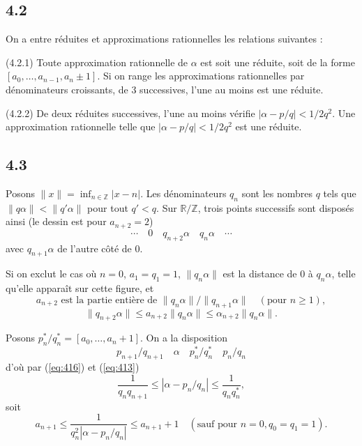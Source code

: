 \documentclass[12pt]{amsart}
\theoremstyle{plain}
\theoremstyle{remark}
\begin{document}
\subsection*{4.2}
On a entre r\'{e}duites et approximations rationnelles les relations suivantes :

(4.2.1) Toute approximation rationnelle de $\alpha$ est soit une r\'{e}duite, soit de la forme $[a_{0}, \ldots, a_{n-1}, a_{n} \pm 1]$. Si on range les approximations rationnelles par d\'{e}nominateurs croissants, de $3$ successives, l'une au moins est une r\'{e}duite.

(4.2.2) De deux r\'{e}duites successives, l'une au moins v\'{e}rifie $|\alpha - p/q| < 1/2q^{2}$. Une approximation rationnelle telle que $|\alpha - p/q| < 1/2q^{2}$ est une r\'{e}duite.

\subsection*{4.3}
Posons $\|x\| = \inf_{n \in \mathbb{Z}} |x - n|$. Les d\'{e}nominateurs $q_{n}$ sont les nombres $q$ tels que $\|q\alpha\| < \|q'\alpha\|$ pour tout $q' < q$. Sur $\mathbb{R}/\mathbb{Z}$, trois points successifs sont dispos\'{e}s ainsi (le dessin est pour $a_{n+2} = 2$)
\[
\cdots \quad 0 \quad q_{n+2}\alpha \quad q_{n}\alpha \quad \cdots
\]
avec $q_{n+1}\alpha$ de l'autre c\^{o}t\'{e} de $0$.

Si on exclut le cas o\`{u} $n = 0$, $a_{1} = q_{1} = 1$, $\|q_{n}\alpha\|$ est la distance de $0$ \`{a} $q_{n}\alpha$, telle qu'elle appara\^{i}t sur cette figure, et
\begin{equation}\label{eq:432}
a_{n+2} \text{ est la partie enti\`{e}re de } \|q_{n}\alpha\|/\|q_{n+1}\alpha\| \quad (\text{pour } n \geq 1) ,
\end{equation}
\begin{equation}\label{eq:433}
\|q_{n+2}\alpha\| \leq a_{n+2}\|q_{n}\alpha\| \leq \alpha_{n+2}\|q_{n}\alpha\| .
\end{equation}

Posons $p_{n}^{*}/q_{n}^{*} = [a_{0}, \ldots, a_{n} + 1]$. On a la disposition
\[
p_{n+1}/q_{n+1} \quad \alpha \quad p_{n}^{*}/q_{n}^{*} \quad p_{n}/q_{n}
\]
d'o\`{u} par (\ref{eq:416}) et (\ref{eq:413})
\begin{equation}\label{eq:435}
\frac{1}{q_{n}q_{n+1}} \leq |\alpha - p_{n}/q_{n}| \leq \frac{1}{q_{n}q_{n}^{*}} ,
\end{equation}
soit
\begin{equation}\label{eq:436}
a_{n+1} \leq \frac{1}{q_{n}^{2}|\alpha - p_{n}/q_{n}|} \leq a_{n+1} + 1 \quad (\text{sauf pour } n = 0, q_{0} = q_{1} = 1) .
\end{equation}
\end{document}
